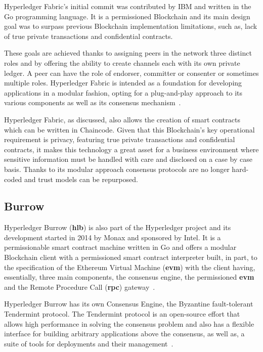 Hyperledger Fabric’s initial commit was contributed by IBM and written in the
Go programming language.  It is a permissioned Blockchain and its main design
goal was to surpass previous Blockchain implementation limitations, such as,
lack of true private transactions and confidential contracts.

These goals are achieved thanks to assigning peers in the network three
distinct roles and by offering the ability to create channels each with its own
private ledger.  A peer can have the role of endorser, committer or consenter
or sometimes multiple roles.  Hyperledger Fabric is intended as a foundation
for developing applications in a modular fashion, opting for a plug-and-play
approach to its various components as well as its consensus
mechanism~\cite{HyperledgerFabricDocs2017}.

Hyperledger Fabric, as discussed, also allows the creation of smart contracts
which can be written in Chaincode.  Given that this Blockchain's key
operational requirement is privacy, featuring true private transactions and
confidential contracts, it makes this technology a great asset for a business
environment where sensitive information must be handled with care and disclosed
on a case by case basis.  Thanks to its modular approach consensus protocols
are no longer hard-coded and trust models can be repurposed.

\subsection{Burrow}

Hyperledger Burrow (\textbf{hlb}) is also part of the Hyperledger project and
its development started in 2014 by Monax and sponsored by Intel. It is a
permissionable smart contract machine written in Go and offers a modular
Blockchain client with a permissioned smart contract interpreter built, in
part, to the specification of the Ethereum Virtual Machine (\textbf{evm}) with
the client having, essentially, three main components, the consensus engine,
the permissioned \textbf{evm} and the Remote Procedure Call (\textbf{rpc})
gateway~\cite{Kuhlman2017,HyperledgerBurrow2017}.

Hyperledger Burrow has its own Consensus Engine, the Byzantine fault-tolerant
Tendermint protocol.  The Tendermint protocol is an open-source effort that
allows high performance in solving the consensus problem and also has a
flexible interface for building arbitrary applications above the consensus, as
well as, a suite of tools for deployments and their
management~\cite{Buchman2016}.

